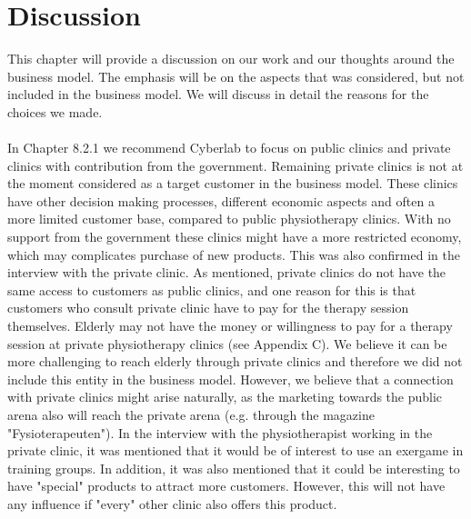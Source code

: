 \chapter{Discussion}
This chapter will provide a discussion on our work and our thoughts around the business model. The emphasis will be on the aspects that was considered, but not included in the business model. We will discuss in detail the reasons for the choices we made.  \\ \\
In Chapter 8.2.1 we recommend Cyberlab to focus on public clinics and private clinics with contribution from the government. Remaining private clinics is not at the moment considered as a target customer in the business model. These clinics have other decision making processes, different economic aspects and often a more limited customer base, compared to public physiotherapy clinics. With no support from the government these clinics might have a more restricted economy, which may complicates purchase of new products. This was also confirmed in the interview with the private clinic. As mentioned, private clinics do not have the same access to customers as public clinics, and one reason for this is that customers who consult private clinic have to pay for the therapy session themselves. Elderly may not have the money or willingness to pay for a therapy session at private physiotherapy clinics (see Appendix C). We believe it can be more challenging to reach elderly through private clinics and therefore we did not include this entity in the business model. However, we believe that a connection with private clinics might arise naturally, as the marketing towards the public arena also will reach the private arena (e.g. through the magazine "Fysioterapeuten"). In the interview with the physiotherapist working in the private clinic, it was mentioned that it would be of interest to use an exergame in training groups. In addition, it was also mentioned that it could be interesting to have "special" products to attract more customers. However, this will not have any influence if "every" other clinic also offers this product.\\ \\
